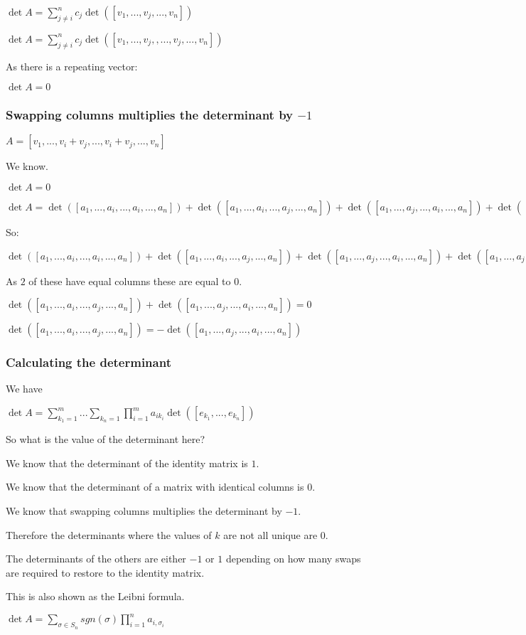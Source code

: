 $\det A=\sum_{j\ne i}^{n}c_j\det ([v_1,...,v_j,...,v_n])$

$\det A=\sum_{j\ne i}^{n}c_j\det ([v_1,...,v_j,,...,v_j,...,v_n])$

As there is a repeating vector:

\(\det A=0\)

\subsubsection{Swapping columns multiplies the determinant by \(-1\)}

$A=[v_1,...,v_i+v_j,...,v_i+v_j,...,v_n]$

We know.

$\det A=0$

$\det A=\det ([a_1,...,a_i,...,a_i,...,a_n])+\det([a_1,...,a_i,...,a_j,...,a_n])+\det([a_1,...,a_j,...,a_i,...,a_n])+\det([a_1,...,a_j,...,a_j,...,a_n])$

So:

$\det ([a_1,...,a_i,...,a_i,...,a_n])+\det ([a_1,...,a_i,...,a_j,...,a_n])+\det([a_1,...,a_j,...,a_i,...,a_n])+\det([a_1,...,a_j,...,a_j,...,a_n])=0$

As \(2\) of these have equal columns these are equal to \(0\).

$\det ([a_1,...,a_i,...,a_j,...,a_n])+\det ([a_1,...,a_j,...,a_i,...,a_n])=0$

$\det ([a_1,...,a_i,...,a_j,...,a_n])=-\det ([a_1,...,a_j,...,a_i,...,a_n])$

\subsubsection{Calculating the determinant}

We have

$\det A=\sum_{k_1=1}^m...\sum_{k_n=1}\prod_{i=1}^ma_{ik_i}\det ([e_{k_1},...,e_{k_n}])$

So what is the value of the determinant here?

We know that the determinant of the identity matrix is \(1\).

We know that the determinant of a matrix with identical columns is \(0\).

We know that swapping columns multiplies the determinant by \(-1\).

Therefore the determinants where the values of \(k\) are not all unique are \(0\).

The determinants of the others are either \(-1\) or \(1\) depending on how many swaps are required to restore to the identity matrix.

This is also shown as the Leibni formula.

$\det A = \sum_{\sigma \in S_n}sgn (\sigma )\prod_{i=1}^na_{i,\sigma_i}$

